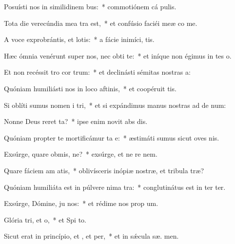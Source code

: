 \item Posuísti nos in similidinem bus:~* commotiónem cá  pulis.
\item Tota die verecúndia mea tra  est,~* et confúsio faciéi meæ co me.
\item A voce exprobrántis, et lotis:~* a fácie inimíci,  tis.
\item Hæc ómnia venérunt super nos, nec obti  te:~* et iníque non égimus in tes o.
\item Et non recéssit tro cor trum:~* et declinásti sémitas nostras   a:
\item Quóniam humiliásti nos in loco aftinis,~* et coopéruit   tis.
\item Si oblíti sumus nomen i tri,~* et si expándimus manus nostras ad de num:
\item Nonne Deus reret ta?~* ipse enim novit abs dis.
\item Quóniam propter te mortificámur ta e:~* æstimáti sumus sicut oves nis.
\item Exsúrge, quare obmis, ne?~* exsúrge, et ne re  nem.
\item Quare fáciem am atis,~* oblivísceris inópiæ nostræ, et tribula træ?
\item Quóniam humiliáta est in púlvere nima tra:~* conglutinátus est in ter  ter.
\item Exsúrge, Dómine, ju nos:~* et rédime nos prop  um.
\item Glória tri, et o,~* et Spi to.
\item Sicut erat in princípio, et , et per,~* et in sǽcula sæ. men.
